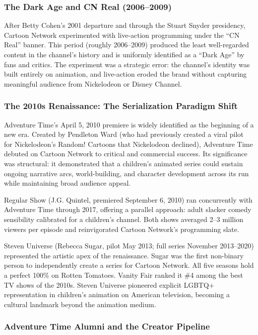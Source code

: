 \documentclass[11pt,letterpaper]{article}
\begin{document}
\subsubsection{The Dark Age and CN Real (2006--2009)}

After Betty Cohen's 2001 departure and through the Stuart Snyder presidency, Cartoon Network experimented with live-action programming under the ``CN Real'' banner. This period (roughly 2006--2009) produced the least well-regarded content in the channel's history and is uniformly identified as a ``Dark Age'' by fans and critics. The experiment was a strategic error: the channel's identity was built entirely on animation, and live-action eroded the brand without capturing meaningful audience from Nickelodeon or Disney Channel.

\subsubsection{The 2010s Renaissance: The Serialization Paradigm Shift}

Adventure Time's April 5, 2010 premiere is widely identified as the beginning of a new era. Created by Pendleton Ward (who had previously created a viral pilot for Nickelodeon's Random! Cartoons that Nickelodeon declined), Adventure Time debuted on Cartoon Network to critical and commercial success. Its significance was structural: it demonstrated that a children's animated series could sustain ongoing narrative arcs, world-building, and character development across its run while maintaining broad audience appeal.

Regular Show (J.G. Quintel, premiered September 6, 2010) ran concurrently with Adventure Time through 2017, offering a parallel approach: adult slacker comedy sensibility calibrated for a children's channel. Both shows averaged 2--3 million viewers per episode and reinvigorated Cartoon Network's programming slate.

Steven Universe (Rebecca Sugar, pilot May 2013; full series November 2013--2020) represented the artistic apex of the renaissance. Sugar was the first non-binary person to independently create a series for Cartoon Network. All five seasons hold a perfect 100\% on Rotten Tomatoes. Vanity Fair ranked it \#4 among the best TV shows of the 2010s. Steven Universe pioneered explicit LGBTQ+ representation in children's animation on American television, becoming a cultural landmark beyond the animation medium.

\subsubsection{Adventure Time Alumni and the Creator Pipeline}
\end{document}
